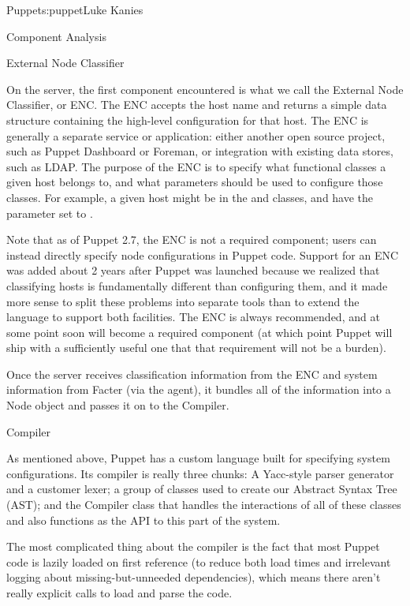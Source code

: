 \begin{aosachapter}{Puppet}{s:puppet}{Luke Kanies}
\begin{aosasect1}{Component Analysis}
\begin{aosasect2}{External Node Classifier}

On the server, the first component encountered is what we call the
External Node Classifier, or ENC.  The ENC accepts the host name and
returns a simple data structure containing the high-level
configuration for that host.  The ENC is generally a separate service
or application: either another open source project, such as Puppet
Dashboard or Foreman, or integration with existing data stores, such
as LDAP.  The purpose of the ENC is to specify what functional classes
a given host belongs to, and what parameters should be used to
configure those classes.  For example, a given host might be in the
 and  classes, and have the parameter 
set to .

Note that as of Puppet 2.7, the ENC is not a required component; users
can instead directly specify node configurations in Puppet code.
Support for an ENC was added about 2 years after Puppet was launched
because we realized that classifying hosts is fundamentally different
than configuring them, and it made more sense to split these problems
into separate tools than to extend the language to support both
facilities.  The ENC is always recommended, and at some point soon
will become a required component (at which point Puppet will ship with
a sufficiently useful one that that requirement will not be a burden).

Once the server receives classification information from the ENC and
system information from Facter (via the agent), it bundles all of the
information into a Node object and passes it on to the Compiler.

\end{aosasect2}

\begin{aosasect2}{Compiler}

As mentioned above, Puppet has a custom language built for specifying
system configurations.  Its compiler is really three chunks: A
Yacc-style parser generator and a customer lexer; a group of classes
used to create our Abstract Syntax Tree (AST); and the Compiler class
that handles the interactions of all of these classes and also
functions as the API to this part of the system.

The most complicated thing about the compiler is the fact that most
Puppet code is lazily loaded on first reference (to reduce both load
times and irrelevant logging about missing-but-unneeded dependencies),
which means there aren't really explicit calls to load and parse the
code.


\end{aosasect2}
\end{aosasect1}
\end{aosachapter}
